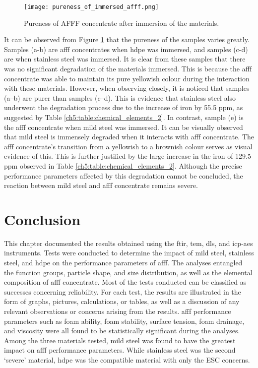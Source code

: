 \begin{figure}[H]
    \centering
    \texttt{[image: pureness\_of\_immersed\_afff.png]}
    \caption{Pureness of AFFF concentrate after immersion of the materials.}
    \label{ch5:figure:pureness}
\end{figure}

It can be observed from Figure \ref{ch5:figure:pureness} that the pureness of the samples varies greatly. Samples (a-b) are \acrshort{afff} concentrates when \acrshort{hdpe} was immersed, and samples (c-d) are when stainless steel was immersed. It is clear from these samples that there was no significant degradation of the materials immersed. This is because the \acrshort{afff} concentrate was able to maintain its pure yellowish colour during the interaction with these materials. However, when observing closely, it is noticed that samples (a–b) are purer than samples (c–d). This is evidence that stainless steel also underwent the degradation process due to the increase of iron by 55.5 ppm, as suggested by Table \ref{ch5:table:chemical_elements_2}. In contrast, sample (e) is the \acrshort{afff} concentrate when mild steel was immersed. It can be visually observed that mild steel is immensely degraded when it interacts with \acrshort{afff} concentrate. The \acrshort{afff} concentrate's transition from a yellowish to a brownish colour serves as visual evidence of this. This is further justified by the large increase in the iron of 129.5 ppm observed in Table \ref{ch5:table:chemical_elements_2}. Although the precise performance parameters affected by this degradation cannot be concluded, the reaction between mild steel and \acrshort{afff} concentrate remains severe.

\section{Conclusion}
This chapter documented the results obtained using the \acrshort{ftir}, \acrshort{tem}, \acrshort{dls}, and \acrshort{icp-aes} instruments. Tests were conducted to determine the impact of mild steel, stainless steel, and \acrshort{hdpe} on the performance parameters of \acrshort{afff}. The analyses entangled the function groups, particle shape, and size distribution, as well as the elemental composition of \acrshort{afff} concentrate. Most of the tests conducted can be classified as successes concerning reliability. For each test, the results are illustrated in the form of graphs, pictures, calculations, or tables, as well as a discussion of any relevant observations or concerns arising from the results. \acrshort{afff} performance parameters such as foam ability, foam stability, surface tension, foam drainage, and viscosity were all found to be statistically significant during the analyses. Among the three materials tested, mild steel was found to have the greatest impact on \acrshort{afff} performance parameters. While stainless steel was the second ‘severe’ material, \acrshort{hdpe} was the compatible material with only the ESC concerns.